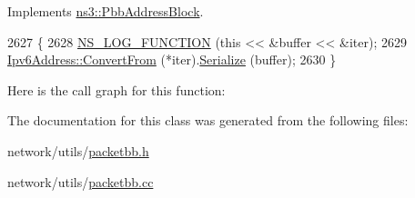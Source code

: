 Implements \hyperlink{classns3_1_1PbbAddressBlock_a53207832167cad2ee8a7783f318c44aa}{ns3\+::\+Pbb\+Address\+Block}.


\begin{DoxyCode}
2627 \{
2628   \hyperlink{log-macros-disabled_8h_a90b90d5bad1f39cb1b64923ea94c0761}{NS\_LOG\_FUNCTION} (\textcolor{keyword}{this} << &buffer << &iter);
2629   \hyperlink{classns3_1_1Ipv6Address_ac00bc221a0b226b2090d05468aec4b79}{Ipv6Address::ConvertFrom} (*iter).\hyperlink{classns3_1_1Ipv6Address_adf5b453892de2893a371380ab299db88}{Serialize} (buffer);
2630 \}
\end{DoxyCode}


Here is the call graph for this function\+:




The documentation for this class was generated from the following files\+:\begin{DoxyCompactItemize}
\item 
network/utils/\hyperlink{packetbb_8h}{packetbb.\+h}\item 
network/utils/\hyperlink{packetbb_8cc}{packetbb.\+cc}\end{DoxyCompactItemize}
